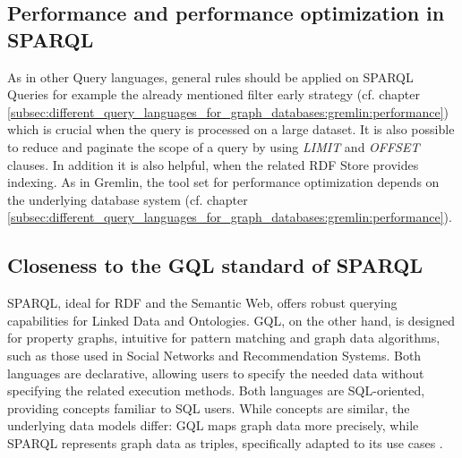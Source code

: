 \subsection{Performance and performance optimization in SPARQL}
\label{subsec:different_query_languages_for_graph_databases:sparql:performance}
As in other Query languages, general rules should be applied on SPARQL Queries for example
the already mentioned filter early 
strategy (cf. chapter \ref*{subsec:different_query_languages_for_graph_databases:gremlin:performance}) 
which is crucial when the query is processed on a large dataset. 
It is also possible to reduce and paginate the scope of a query by using \textit{LIMIT} and \textit{OFFSET}
clauses.
In addition it is also helpful, when the related RDF Store provides indexing.
As in Gremlin, the tool set for performance optimization depends on the 
underlying database system (cf. chapter \ref*{subsec:different_query_languages_for_graph_databases:gremlin:performance}).

\subsection{Closeness to the GQL standard of SPARQL}
\label{subsec:different_query_languages_for_graph_databases:sparql:iso}
SPARQL, ideal for RDF and the Semantic Web, offers robust querying capabilities 
for Linked Data and Ontologies. GQL, on the other hand, is designed for property graphs, 
intuitive for pattern matching and graph data algorithms, 
such as those used in Social Networks and Recommendation Systems. 
Both languages are declarative, 
allowing users to specify the needed data without specifying the related execution methods. 
Both languages are SQL-oriented, providing concepts familiar to SQL users. 
While concepts are similar, the underlying data models differ: 
GQL maps graph data more precisely, while SPARQL represents graph data as triples, 
specifically adapted to its use cases \citep{hare_isoiec_2024} \citep{sparql_2024}.